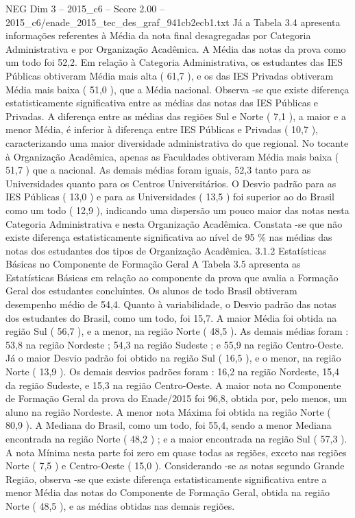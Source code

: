 \begin{textsample}{NEG Dim 3 – 2015\_c6 – Score 2.00 – 2015\_c6/enade\_2015\_tec\_des\_graf\_941cb2ecb1.txt}
Já a Tabela 3.4 apresenta informações referentes à Média da nota final desagregadas por Categoria Administrativa e por Organização Acadêmica.
A Média das notas da prova como um todo foi 52,2.
Em relação à Categoria Administrativa, os estudantes das IES Públicas obtiveram Média mais alta ( 61,7 ), e os das IES Privadas obtiveram Média mais baixa ( 51,0 ), que a Média nacional.
Observa -se que existe diferença estatisticamente significativa entre as médias das notas das IES Públicas e Privadas.
A diferença entre as médias das regiões Sul e Norte ( 7,1 ), a maior e a menor Média, é inferior à diferença entre IES Públicas e Privadas ( 10,7 ), caracterizando uma maior diversidade administrativa do que regional.
No tocante à Organização Acadêmica, apenas as Faculdades obtiveram Média mais baixa ( 51,7 ) que a nacional.
As demais médias foram iguais, 52,3 tanto para as Universidades quanto para os Centros Universitários.
O Desvio padrão para as IES Públicas ( 13,0 ) e para as Universidades ( 13,5 ) foi superior ao do Brasil como um todo ( 12,9 ), indicando uma dispersão um pouco maior das notas nesta Categoria Administrativa e nesta Organização Acadêmica.
Constata -se que não existe diferença estatisticamente significativa ao nível de 95 \% nas médias das notas dos estudantes dos tipos de Organização Acadêmica. 3.1.2 Estatísticas Básicas no Componente de Formação Geral A Tabela 3.5 apresenta as Estatísticas Básicas em relação ao componente da prova que avalia a Formação Geral dos estudantes concluintes.
Os alunos de todo Brasil obtiveram desempenho médio de 54,4.
Quanto à variabilidade, o Desvio padrão das notas dos estudantes do Brasil, como um todo, foi 15,7.
A maior Média foi obtida na região Sul ( 56,7 ), e a menor, na região Norte ( 48,5 ).
As demais médias foram : 53,8 na região Nordeste ; 54,3 na região Sudeste ; e 55,9 na região Centro-Oeste.
Já o maior Desvio padrão foi obtido na região Sul ( 16,5 ), e o menor, na região Norte ( 13,9 ).
Os demais desvios padrões foram : 16,2 na região Nordeste, 15,4 da região Sudeste, e 15,3 na região Centro-Oeste.
A maior nota no Componente de Formação Geral da prova do Enade/2015 foi 96,8, obtida por, pelo menos, um aluno na região Nordeste.
A menor nota Máxima foi obtida na região Norte ( 80,9 ).
A Mediana do Brasil, como um todo, foi 55,4, sendo a menor Mediana encontrada na região Norte ( 48,2 ) ; e a maior encontrada na região Sul ( 57,3 ).
A nota Mínima nesta parte foi zero em quase todas as regiões, exceto nas regiões Norte ( 7,5 ) e Centro-Oeste ( 15,0 ).
Considerando -se as notas segundo Grande Região, observa -se que existe diferença estatisticamente significativa entre a menor Média das notas do Componente de Formação Geral, obtida na região Norte ( 48,5 ), e as médias obtidas nas demais regiões.

\end{textsample}
